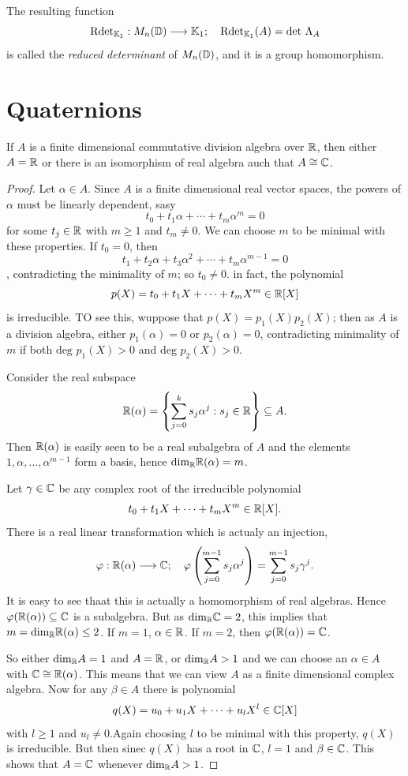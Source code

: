 The resulting function
\[ \text{Rdet}_{\K_1}: M_n(\D)\longrightarrow \K_1;\hspace{10px}\text{Rdet}_{\K_1}(A)=\text{det }\Lambda_A \]
is called the {\it reduced determinant} of \(M_n(\mathbb{D})\), and it is a group homomorphism.

\section{Quaternions}

\begin{proposition}
  If \(A\) is a finite dimensional commutative division algebra over \(\mathbb{R}\),
  then either \(A=\mathbb{R}\) or there is an isomorphism of real algebra auch that \(A\cong\mathbb{C}\).
\end{proposition}

\begin{proof}
  Let \(\alpha\in A\). Since \(A\) is a finite dimensional real vector spaces, the powers
  of \(\alpha\) must be linearly dependent, sasy
  \[ t_0+t_1\alpha+\cdots+t_m\alpha^m=0 \]
  for some \(t_j\in\mathbb{R}\) with \(m\ge 1\) and \(t_m\ne 0\). We can choose \(m\) to be
  minimal with these properties. If \(t_0=0\), then
  \[ t_1+t_2\alpha+t_3\alpha^2+\cdots+t_m\alpha^{m-1}=0 \],
  contradicting the minimality of \(m\); so \(t_0\ne 0\). in fact, the polynomial
  \[ p(X)=t_0+t_1X+\cdots+t_mX^m \in\mathbb{R}[X] \]
  is irreducible. TO see this, wuppose that \(p(X)=p_1(X)p_2(X)\); then as \(A\) is a
  division algebra, either \(p_1(\alpha)=0\) or \(p_2(\alpha)=0\), contradicting minimality
  of \(m\) if both \(\text{deg }p_1(X)>0\) and \(\text{deg }p_2(X)>0\).

  Consider the real subspace
  \[ \mathbb{R}(\alpha)=\left\{\sum_{j=0}^k s_j\alpha^j:s_j\in\mathbb{R}\right\}\subseteq A. \]
  Then \(\mathbb{R}(\alpha)\) is easily seen to be a real subalgebra of \(A\) and the elements
  \(1,\alpha,\dots,\alpha^{m-1}\) form a basis, hence \(\text{dim}_{\mathbb{R}}\mathbb{R}(\alpha)=m\).

  Let \(\gamma\in\mathbb{C}\) be any complex root of the irreducible polynomial
  \[ t_0+t_1X+\cdots+t_mX^m \in\mathbb{R}[X]. \]
  There is a real linear transformation which is actualy an injection,
  \[ \varphi:\R(\alpha)\longrightarrow\C;\hspace{10px}\varphi\left(\sum_{j=0}^{m-1} s_j\alpha^j\right) = \sum_{j=0}^{m-1}s_j\gamma^j. \]
  It is easy to see thaat this is actually a homomorphism of real algebras. Hence
  \(\varphi(\mathbb{R}(\alpha))\subseteq\mathbb{C}\) is a subalgebra. But as \(\text{dim}_{\mathbb{R}}\mathbb{C}=2\),
  this implies that \(m=\text{dim}_{\mathbb{R}}\mathbb{R}(\alpha)\le 2\). If \(m=1\), \(\alpha\in\mathbb{R}\).
  If \(m=2\), then \(\varphi(\mathbb{R}(\alpha))=\mathbb{C}\).

  So either \(\text{dim}_{\mathbb{R}}A=1\) and \(A=\mathbb{R}\), or \(\text{dim}_{\mathbb{R}}A>1\) and we can
  choose an \(\alpha\in A\) with \(\mathbb{C}\cong\mathbb{R}(\alpha)\). This means that we can view \(A\)
  as a finite dimensional complex algebra. Now for any \(\beta\in A\) there is polynomial
  \[ q(X)=u_0+u_1X+\cdots+u_lX^l\in\mathbb{C}[X] \]
  with \(l\ge 1\) and \(u_l\ne 0\).Again choosing \(l\) to be minimal with this
  property, \(q(X)\) is irreducible. But then sinec \(q(X)\) has a root in \(\mathbb{C}\),
  \(l=1\) and \(\beta\in\mathbb{C}\). This shows that \(A=\mathbb{C}\) whenever \(\text{dim}_{\mathbb{R}}A>1\).
\end{proof}

